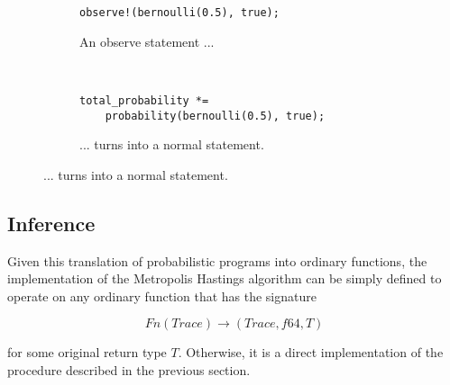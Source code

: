\begin{figure}[H]
\begin{subfigure}{0.5\textwidth}
\begin{lstlisting}
observe!(bernoulli(0.5), true);
\end{lstlisting}
\caption{An observe statement ...}
\end{subfigure}
~
\begin{subfigure}{0.5\textwidth}
\begin{lstlisting}
total_probability *= 
    probability(bernoulli(0.5), true);
\end{lstlisting}
\caption{... turns into a normal statement.}
\end{subfigure}
\end{figure}

\subsection{Inference}

Given this translation of probabilistic programs into ordinary functions, the implementation of the Metropolis Hastings algorithm can be simply defined to operate on any ordinary function that has the signature

\begin{equation*}
    Fn(Trace) \rightarrow (Trace, f64, T)
\end{equation*}

for some original return type $T$. Otherwise, it is a direct implementation of the procedure described in the previous section.
